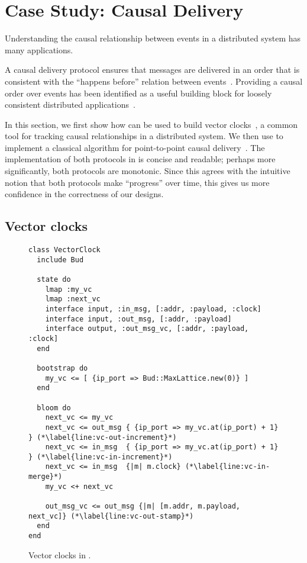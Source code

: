 \section{Case Study: Causal Delivery}
\label{sec:causal}


Understanding the causal relationship between events in a distributed system has
many applications.

A causal delivery protocol ensures that messages are delivered in an order that
is consistent with the ``happens before'' relation between
events~\cite{Lamport1978}. Providing a causal order over events has been
identified as a useful building block for loosely consistent distributed
applications~\cite{Lloyd2011}.

In this section, we first show how \lang can be used to build vector
clocks~\cite{Fidge1988,Mattern1989}, a common tool for tracking causal
relationships in a distributed system. We then use \lang to implement a
classical algorithm for point-to-point causal delivery~\cite{Schiper1989}. The
implementation of both protocols in \lang is concise and readable; perhaps more
significantly, both protocols are monotonic. Since this agrees with the
intuitive notion that both protocols make ``progress'' over time, this gives us
more confidence in the correctness of our designs.

\subsection{Vector clocks}
\begin{figure}[t]
\begin{scriptsize}
\begin{lstlisting}
class VectorClock
  include Bud

  state do
    lmap :my_vc
    lmap :next_vc
    interface input, :in_msg, [:addr, :payload, :clock]
    interface input, :out_msg, [:addr, :payload]
    interface output, :out_msg_vc, [:addr, :payload, :clock]
  end

  bootstrap do
    my_vc <= [ {ip_port => Bud::MaxLattice.new(0)} ]
  end

  bloom do
    next_vc <= my_vc
    next_vc <= out_msg { {ip_port => my_vc.at(ip_port) + 1} } (*\label{line:vc-out-increment}*)
    next_vc <= in_msg  { {ip_port => my_vc.at(ip_port) + 1} } (*\label{line:vc-in-increment}*)
    next_vc <= in_msg  {|m| m.clock} (*\label{line:vc-in-merge}*)
    my_vc <+ next_vc

    out_msg_vc <= out_msg {|m| [m.addr, m.payload, next_vc]} (*\label{line:vc-out-stamp}*)
  end
end
\end{lstlisting}
\end{scriptsize}
\caption{Vector clocks in \lang.}
\label{fig:vector-clock-src}
\end{figure}

